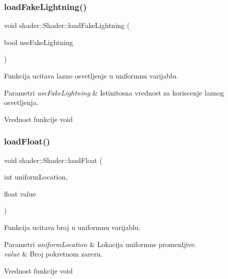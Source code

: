 \subsubsection{\texorpdfstring{load\+Fake\+Lightning()}{loadFakeLightning()}}
{\footnotesize\ttfamily void shader\+::\+Shader\+::load\+Fake\+Lightning (\begin{DoxyParamCaption}\item[{bool}]{use\+Fake\+Lightning }\end{DoxyParamCaption})}



Funkcija ucitava lazno osvetljenje u uniformnu varijablu. 


\begin{DoxyParams}{Parametri}
{\em use\+Fake\+Lightning} & Istinitosna vrednost za koriscenje laznog osvetljenja. \\
\hline
\end{DoxyParams}
\begin{DoxyReturn}{Vrednost funkcije}
void 
\end{DoxyReturn}
\mbox{\label{classshader_1_1Shader_ae9dde8789a747d037f136c91a8cc03b6}} 
\subsubsection{\texorpdfstring{load\+Float()}{loadFloat()}}
{\footnotesize\ttfamily void shader\+::\+Shader\+::load\+Float (\begin{DoxyParamCaption}\item[{int}]{uniform\+Location,  }\item[{float}]{value }\end{DoxyParamCaption})}



Funkcija ucitava broj u uniformnu varijablu. 


\begin{DoxyParams}{Parametri}
{\em uniform\+Location} & Lokacija uniformne promenljive. \\
\hline
{\em value} & Broj pokretnom zarezu. \\
\hline
\end{DoxyParams}
\begin{DoxyReturn}{Vrednost funkcije}
void 
\end{DoxyReturn}
\mbox{\label{classshader_1_1Shader_a06b6080ebb6c1735747771678dbec4b6}} 
